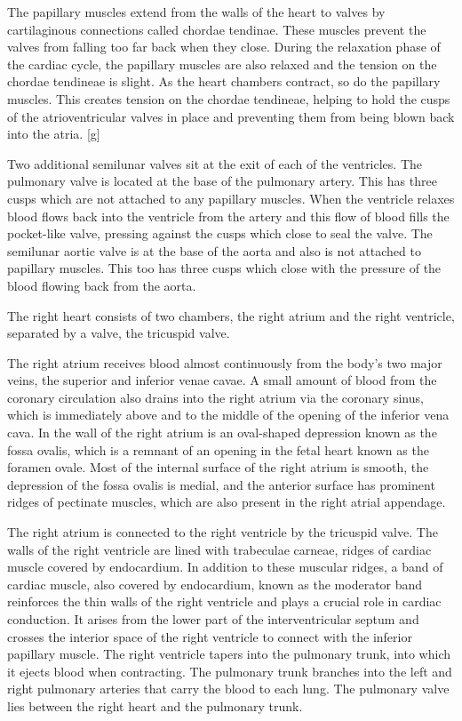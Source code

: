 The papillary muscles extend from the walls of the heart to valves by cartilaginous connections called chordae tendinae. These muscles prevent the valves from falling too far back when they close. During the relaxation phase of the cardiac cycle, the papillary muscles are also relaxed and the tension on the chordae tendineae is slight. As the heart chambers contract, so do the papillary muscles. This creates tension on the chordae tendineae, helping to hold the cusps of the atrioventricular valves in place and preventing them from being blown back into the atria. {[}g{]}

Two additional semilunar valves sit at the exit of each of the ventricles. The pulmonary valve is located at the base of the pulmonary artery. This has three cusps which are not attached to any papillary muscles. When the ventricle relaxes blood flows back into the ventricle from the artery and this flow of blood fills the pocket-like valve, pressing against the cusps which close to seal the valve. The semilunar aortic valve is at the base of the aorta and also is not attached to papillary muscles. This too has three cusps which close with the pressure of the blood flowing back from the aorta.

The right heart consists of two chambers, the right atrium and the right ventricle, separated by a valve, the tricuspid valve.

The right atrium receives blood almost continuously from the body's two major veins, the superior and inferior venae cavae. A small amount of blood from the coronary circulation also drains into the right atrium via the coronary sinus, which is immediately above and to the middle of the opening of the inferior vena cava. In the wall of the right atrium is an oval-shaped depression known as the fossa ovalis, which is a remnant of an opening in the fetal heart known as the foramen ovale. Most of the internal surface of the right atrium is smooth, the depression of the fossa ovalis is medial, and the anterior surface has prominent ridges of pectinate muscles, which are also present in the right atrial appendage.

The right atrium is connected to the right ventricle by the tricuspid valve. The walls of the right ventricle are lined with trabeculae carneae, ridges of cardiac muscle covered by endocardium. In addition to these muscular ridges, a band of cardiac muscle, also covered by endocardium, known as the moderator band reinforces the thin walls of the right ventricle and plays a crucial role in cardiac conduction. It arises from the lower part of the interventricular septum and crosses the interior space of the right ventricle to connect with the inferior papillary muscle. The right ventricle tapers into the pulmonary trunk, into which it ejects blood when contracting. The pulmonary trunk branches into the left and right pulmonary arteries that carry the blood to each lung. The pulmonary valve lies between the right heart and the pulmonary trunk.

